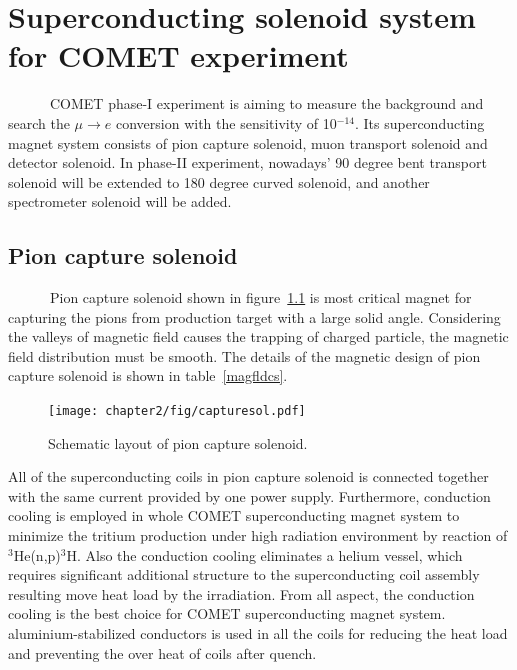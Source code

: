 \chapter{Superconducting solenoid system for COMET experiment}
~~~~~~COMET phase-I experiment is aiming to measure the background and search the $\mu \rightarrow e$ conversion with the sensitivity of 10$^{-14}$.
Its superconducting magnet system consists of pion capture solenoid, muon transport solenoid and detector solenoid.
In phase-II experiment, nowadays' 90 degree bent transport solenoid will be extended to 180 degree curved solenoid, and another spectrometer solenoid will be added.
 
 \section{Pion capture solenoid}
~~~~~~Pion capture solenoid shown in figure~\ref{capturesol} is most critical magnet for capturing the pions from production target with a large solid angle.
Considering the valleys of magnetic field causes the trapping of charged particle, the magnetic field distribution must be smooth.
The details of the magnetic design of pion capture solenoid is shown in table~\ref{magfldcs}.
\begin{figure}[H]
 \centering
 \texttt{[image: chapter2/fig/capturesol.pdf]}
 \caption{Schematic layout of pion capture solenoid.}
 \label{capturesol}
\end{figure}
All of the superconducting coils in pion capture solenoid is connected together with the same current provided by one power supply.
Furthermore, conduction cooling is employed in whole COMET superconducting magnet system to minimize the tritium production under high radiation environment by reaction of $^3$He(n,p)$^3$H.
Also the conduction cooling eliminates a helium vessel, which requires significant additional structure to the superconducting coil assembly resulting move heat load by the irradiation.
From all aspect, the conduction cooling is the best choice for COMET superconducting magnet system.
aluminium-stabilized conductors is used in all the coils for reducing the heat load and preventing the over heat of coils after quench.
